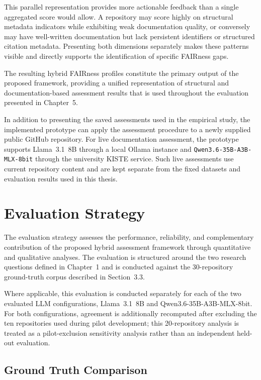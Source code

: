 This parallel representation provides more actionable feedback than 
a single aggregated score would allow. A repository may score 
highly on structural metadata indicators while exhibiting weak 
documentation quality, or conversely may have well-written 
documentation but lack persistent identifiers or structured 
citation metadata. Presenting both dimensions separately makes 
these patterns visible and directly supports the identification 
of specific FAIRness gaps.

The resulting hybrid FAIRness profiles constitute the primary
output of the proposed framework, providing a unified representation
of structural and documentation-based assessment results that is
used throughout the evaluation presented in Chapter~5.

In addition to presenting the saved assessments used in the empirical
study, the implemented prototype can apply the assessment procedure
to a newly supplied public GitHub repository. For live documentation
assessment, the prototype supports Llama~3.1~8B through a local
Ollama instance and \texttt{Qwen3.6-35B-A3B-MLX-8bit} through the
university KISTE service. Such live assessments use current repository
content and are kept separate from the fixed datasets and evaluation
results used in this thesis.

\section{Evaluation Strategy}

The evaluation strategy assesses the performance, reliability, and
complementary contribution of the proposed hybrid assessment
framework through quantitative and qualitative analyses. The evaluation is
structured around the two research questions defined in
Chapter~1 and is conducted against the 30-repository ground-truth
corpus described in Section~3.3.

Where applicable, this evaluation is conducted separately for each 
of the two evaluated LLM configurations, Llama~3.1~8B and Qwen3.6-35B-A3B-MLX-8bit. 
For both configurations, agreement is additionally recomputed after excluding 
the ten repositories used during pilot development; this 20-repository analysis 
is treated as a pilot-exclusion sensitivity analysis rather than an independent 
held-out evaluation.

\subsection{Ground Truth Comparison}

